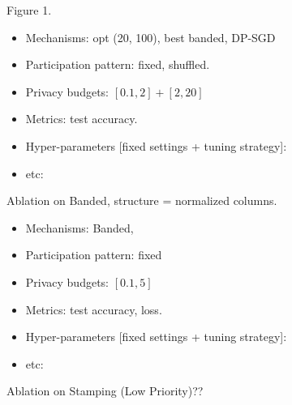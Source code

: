 
Figure 1.
\begin{itemize}
    \item Mechanisms: opt (20, 100), best banded, DP-SGD
    \item Participation pattern: fixed, shuffled.
    \item Privacy budgets: $[0.1, 2] + [2, 20]$
    \item Metrics: test accuracy.
    \item Hyper-parameters [fixed settings + tuning strategy]:
    \item etc:
\end{itemize}

Ablation on Banded, structure = normalized columns.
\begin{itemize}
    \item Mechanisms: Banded, 
    \item Participation pattern: fixed 
    \item Privacy budgets: $[0.1, 5]$
    \item Metrics: test accuracy, loss. 
    \item Hyper-parameters [fixed settings + tuning strategy]:
    \item etc:
\end{itemize}

Ablation on Stamping (Low Priority)??
